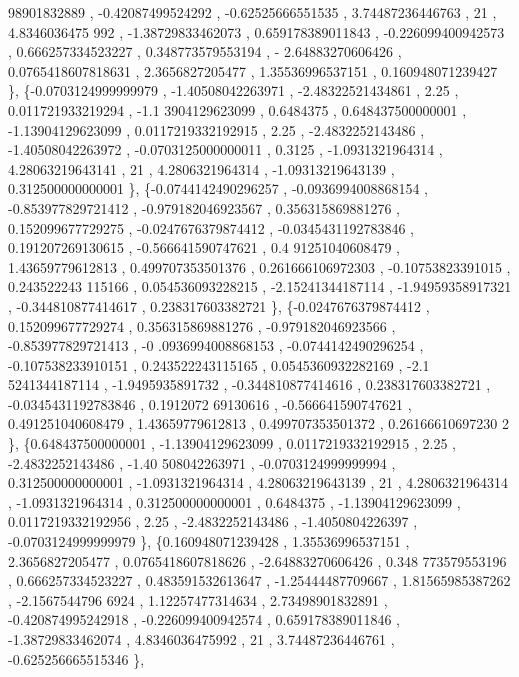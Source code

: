 \begin{DoxyCode}
      98901832889 , -0.42087499524292 , -0.62525666551535 ,  3.74487236446763 ,                21 ,   4.8346036475
      992 , -1.38729833462073 , 0.659178389011843 , -0.226099400942573 , 0.666257334523227 , 0.348773579553194 , -
      2.64883270606426 , 0.0765418607818631 ,   2.3656827205477 ,  1.35536996537151 , 0.160948071239427 \},
\{-0.0703124999999979 , -1.40508042263971 , -2.48322521434861 ,              2.25 , 0.011721933219294 , -1.1
      3904129623099 ,         0.6484375 , 0.648437500000001 , -1.13904129623099 , 0.0117219332192915 ,            
        2.25 ,  -2.4832252143486 , -1.40508042263972 , -0.0703125000000011 ,            0.3125 ,  -1.0931321964314
       ,  4.28063219643141 ,                21 ,   4.2806321964314 , -1.09313219643139 , 0.312500000000001 \},
\{-0.0744142490296257 , -0.0936994008868154 , -0.853977829721412 , -0.979182046923567 , 0.356315869881276 , 
      0.152099677729275 , -0.0247676379874412 , -0.0345431192783846 , 0.191207269130615 , -0.566641590747621 , 0.4
      91251040608479 ,  1.43659779612813 , 0.499707353501376 , 0.261666106972303 , -0.10753823391015 , 0.243522243
      115166 , 0.054536093228215 , -2.15241344187114 , -1.94959358917321 , -0.344810877414617 , 0.238317603382721 
      \},
\{-0.0247676379874412 , 0.152099677729274 , 0.356315869881276 , -0.979182046923566 , -0.853977829721413 , -0
      .0936994008868153 , -0.0744142490296254 , -0.107538233910151 , 0.243522243115165 , 0.0545360932282169 , -2.1
      5241344187114 ,  -1.9495935891732 , -0.344810877414616 , 0.238317603382721 , -0.0345431192783846 , 0.1912072
      69130616 , -0.566641590747621 , 0.491251040608479 ,  1.43659779612813 , 0.499707353501372 , 0.26166610697230
      2 \},
\{0.648437500000001 , -1.13904129623099 , 0.0117219332192915 ,              2.25 ,  -2.4832252143486 , -1.40
      508042263971 , -0.0703124999999994 , 0.312500000000001 ,  -1.0931321964314 ,  4.28063219643139 ,            
          21 ,   4.2806321964314 ,  -1.0931321964314 , 0.312500000000001 ,         0.6484375 , -1.13904129623099 ,
       0.0117219332192956 ,              2.25 ,  -2.4832252143486 ,  -1.4050804226397 , -0.0703124999999979 \},
\{0.160948071239428 ,  1.35536996537151 ,   2.3656827205477 , 0.0765418607818626 , -2.64883270606426 , 0.348
      773579553196 , 0.666257334523227 , 0.483591532613647 , -1.25444487709667 ,  1.81565985387262 , -2.1567544796
      6924 ,  1.12257477314634 ,  2.73498901832891 , -0.420874995242918 , -0.226099400942574 , 0.659178389011846 ,
       -1.38729833462074 ,   4.8346036475992 ,                21 ,  3.74487236446761 , -0.625256665515346 \},

\end{DoxyCode}
